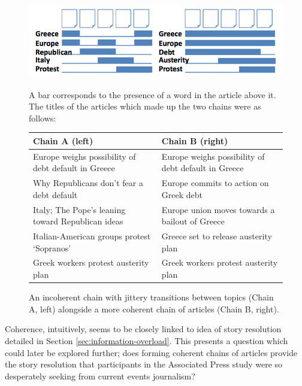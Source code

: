 \begin{figure}[htbp!]
	\centering
	\includegraphics[width=.7\textwidth]{img/lit-survey/coverage.png} \par
	 A bar corresponds to the presence of a word in the article above it.\\The titles of the articles which made up the two chains were as follows:\\[0.2cm]\footnotesize{
	 \begin{tabular}{|l|l|}
	 	\hline 
	 	Chain A (left) & Chain B (right) \\
	 	\hline
	 	Europe weighs possibility of debt default in Greece & Europe weighs possibility of debt default in Greece \\
	 	Why Republicans don't fear a debt default & Europe commits to action on Greek debt \\
	 	Italy; The Pope's leaning toward Republican ideas & Europe union moves towards a bailout of Greece \\
	 	Italian-American groups protest `Sopranos' & Greece set to release austerity plan \\
	 	Greek workers protest austerity plan & Greek workers protest austerity plan \\
	 	\hline
	 \end{tabular}\vspace{0.2cm}}
	 \caption{An incoherent chain with jittery transitions between topics (Chain A, left) alongside a more coherent chain of articles (Chain B, right). \citep{GeneratingInformationMaps}}
	\label{fig:coverage}
\end{figure}

Coherence, intuitively, seems to be closely linked to idea of story resolution detailed in Section \ref{sec:information-overload}. This presents a question which could later be explored further; does forming coherent chains of articles provide the story resolution that participants in the Associated Press study were so desperately seeking from current events journalism?
	
